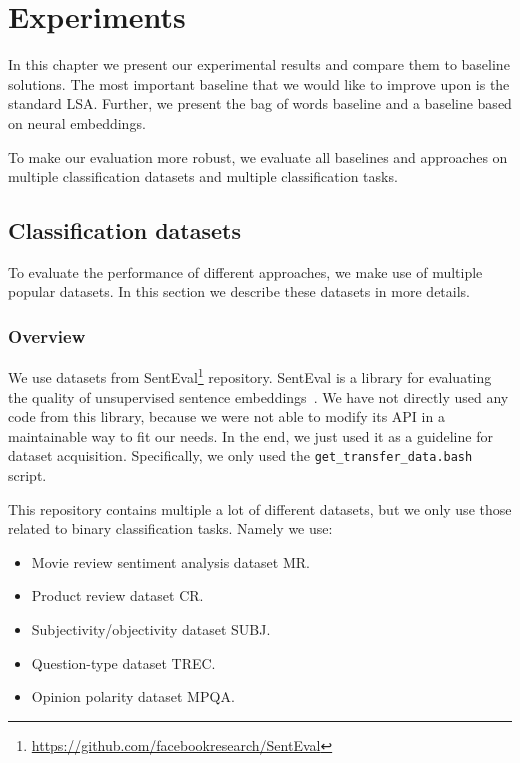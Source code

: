 \chapter{Experiments}

In this chapter we present our experimental results and compare them to baseline solutions.
The most important baseline that we would like to improve upon is the standard LSA.
Further, we present the bag of words baseline and a baseline based on neural embeddings.

To make our evaluation more robust, we evaluate all baselines and approaches on multiple classification datasets and multiple classification tasks.

\section{Classification datasets}
    
    To evaluate the performance of different approaches, we make use of multiple popular datasets.
    In this section we describe these datasets in more details.
    
    \subsection{Overview} \label{sec:data:overview}
    
    We use datasets from  SentEval\footnote{\url{https://github.com/facebookresearch/SentEval}} repository.
    SentEval is a library for evaluating the quality of unsupervised sentence embeddings~\cite{conneau2017supervised}.
    We have not directly used  any code from this library, because we were not able to modify its API in a maintainable way to fit our needs. 
    In the end, we just used it as a guideline for dataset acquisition.
    Specifically, we only used the \texttt{get\_transfer\_data.bash} script.
    
    This repository contains multiple a lot of different datasets, 
    but we only use those related to binary classification tasks.
    Namely we use:
    \begin{itemize}
        \item Movie review sentiment analysis dataset MR.
        \item Product review dataset CR.
        \item Subjectivity/objectivity dataset SUBJ.
        \item Question-type dataset TREC.
        \item Opinion polarity dataset MPQA.
    \end{itemize}
    
